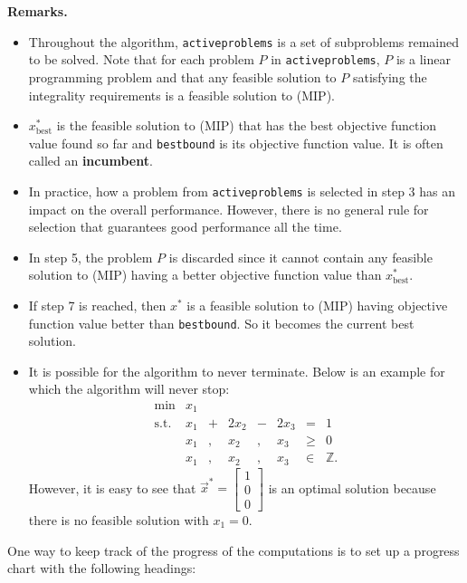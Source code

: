 \textbf{Remarks.}

\begin{itemize}
\item
  Throughout the algorithm, \texttt{activeproblems} is a set of
  subproblems remained to be solved. Note that for each problem \(P\) in
  \texttt{activeproblems}, \(P\) is a linear programming problem and
  that any feasible solution to \(P\) satisfying the integrality
  requirements is a feasible solution to (MIP).
\item
  \(x^*_{\text{best}}\) is the feasible solution to (MIP) that has the
  best objective function value found so far and \texttt{bestbound} is
  its objective function value. It is often called an
  \textbf{incumbent}.
\item
  In practice, how a problem from \texttt{activeproblems} is selected in
  step 3 has an impact on the overall performance. However, there is no
  general rule for selection that guarantees good performance all the
  time.
\item
  In step 5, the problem \(P\) is discarded since it cannot contain any
  feasible solution to (MIP) having a better objective function value
  than \(x^*_{\text{best}}\).
\item
  If step 7 is reached, then \(x^*\) is a feasible solution to (MIP)
  having objective function value better than \texttt{bestbound}. So it
  becomes the current best solution.
\item
  It is possible for the algorithm to never terminate. Below is an
  example for which the algorithm will never stop:
  \[\begin{array}{rrcrcrcl}
  \min & x_1 \\
  \text{s.t.} & x_1 & + &  2x_2&  -&  2x_3&  =&  1 \\
  & x_1& , & x_2& , & x_3 & \geq & 0 \\
  & x_1& ,&  x_2& , & x_3 & \in & \mathbb{Z}.
  \end{array}
  \] However, it is easy to see that
  \(\vec{x}^* = \begin{bmatrix} 1 \\ 0 \\ 0\end{bmatrix}\) is an optimal
  solution because there is no feasible solution with \(x_1=0\).
\end{itemize}

One way to keep track of the progress of the computations is to set up a
progress chart with the following headings:

